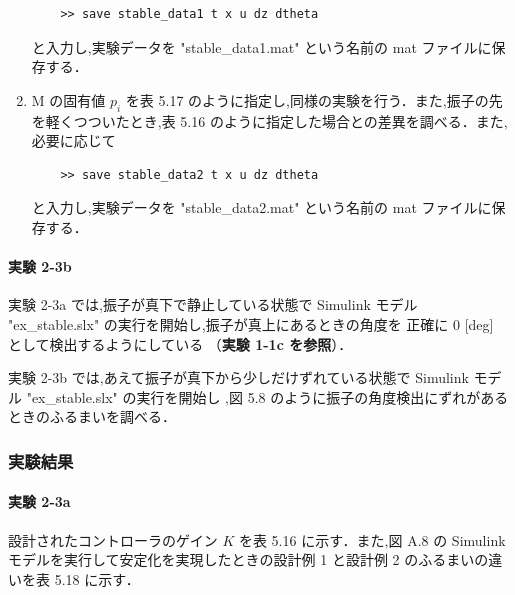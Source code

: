 \begin{enumerate}
        \begin{tcolorbox}[colback=gray!5!white,colframe=gray!75!black]
          \begin{lstlisting}
    >> save stable_data1 t x u dz dtheta
    \end{lstlisting}
        \end{tcolorbox}
        
        と入力し,実験データを "stable\_data1.mat" という名前の mat ファイルに保存する．
        
  \item M の固有値 \( p_i \) を表 5.17 のように指定し,同様の実験を行う．また,振子の先を軽くつついたとき,表 5.16 のように指定した場合との差異を調べる．また,必要に応じて
        
        \begin{tcolorbox}[colback=gray!5!white,colframe=gray!75!black]
          \begin{lstlisting}
    >> save stable_data2 t x u dz dtheta
    \end{lstlisting}
        \end{tcolorbox}
        
        と入力し,実験データを "stable\_data2.mat" という名前の mat ファイルに保存する．
\end{enumerate}

\paragraph{実験 2-3b}
実験 2-3a では,振子が真下で静止している状態で Simulink モデル 
"ex\_stable.slx" の実行を開始し,振子が真上にあるときの角度を
正確に 0 [deg] として検出するようにしている
（\textbf{実験 1-1c を参照}）．

実験 2-3b では,あえて振子が真下から少しだけずれている状態で
Simulink モデル "ex\_stable.slx" の実行を開始し
,図 5.8 のように振子の角度検出にずれがあるときのふるまいを調べる．

\subsubsection{実験結果}

\paragraph{実験 2-3a}
設計されたコントローラのゲイン \( K \) を表 5.16 に示す．また,図 A.8 の Simulink モデルを実行して安定化を実現したときの設計例 1 と設計例 2 のふるまいの違いを表 5.18 に示す．

